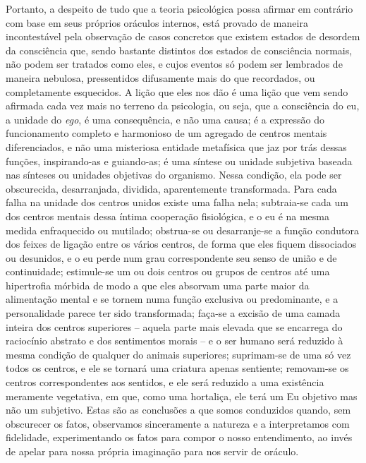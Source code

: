 Portanto, a despeito de tudo que a teoria psicológica possa afirmar em
contrário com base em seus próprios oráculos internos, está provado de
maneira incontestável pela observação de casos concretos que existem 
estados de desordem da consciência que, sendo bastante distintos dos
estados de consciência normais, não podem ser tratados como eles, e
cujos eventos só podem ser lembrados de maneira nebulosa, pressentidos
difusamente mais do que recordados, ou completamente esquecidos.  A
lição que eles nos dão é uma lição que vem sendo afirmada cada vez mais
no terreno da psicologia, ou seja, que a consciência do eu, a
unidade do \textit{ego}, é uma consequência, e não uma causa; é a
expressão do funcionamento completo e harmonioso de um agregado de
centros mentais diferenciados, e não uma misteriosa entidade metafísica
que jaz por trás dessas funções, inspirando-as e guiando-as; é uma
síntese ou unidade subjetiva baseada nas sínteses ou unidades objetivas
do organismo. Nessa condição, ela pode ser obscurecida, desarranjada,
dividida, aparentemente transformada.  Para cada falha na unidade dos
centros unidos existe uma falha nela; subtraia-se cada um dos centros
mentais dessa íntima cooperação fisiológica, e o eu é na mesma medida
enfraquecido ou mutilado; obstrua-se ou desarranje-se a função
condutora dos feixes de ligação entre os vários centros, de forma que
eles fiquem dissociados ou desunidos, e o eu perde num grau
correspondente seu senso de união e de continuidade; estimule-se um ou
dois centros ou grupos de centros até uma hipertrofia mórbida de modo a
que eles absorvam uma parte maior da alimentação mental e se tornem
numa função exclusiva ou predominante, e a personalidade parece ter
sido transformada; faça-se a excisão de uma camada inteira dos centros
superiores -- aquela parte mais elevada que se encarrega do raciocínio
abstrato e dos sentimentos morais -- e o ser humano será reduzido à
mesma condição de qualquer do animais superiores; suprimam-se de uma só
vez todos os centros, e ele se tornará uma criatura apenas sentiente;
removam-se os centros correspondentes aos sentidos, e ele será reduzido
a uma existência meramente vegetativa, em que, como uma hortaliça, ele
terá um Eu objetivo mas não um subjetivo. Estas são as conclusões a que
somos conduzidos quando, sem obscurecer os fatos, observamos
sinceramente a natureza e a interpretamos com fidelidade,
experimentando os fatos para compor o nosso entendimento, ao invés de
apelar para nossa própria imaginação para nos servir de oráculo. 





